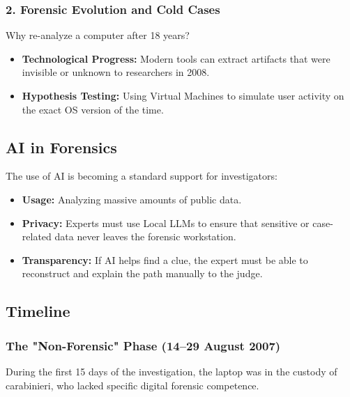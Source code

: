 \subsubsection*{2. Forensic Evolution and Cold Cases}
Why re-analyze a computer after 18 years?
\begin{itemize}
    \item \textbf{Technological Progress:} Modern tools can extract artifacts that were invisible or unknown to researchers in 2008.
    \item \textbf{Hypothesis Testing:} Using Virtual Machines to simulate user activity on the exact OS version of the time.
\end{itemize}

\subsection{AI in Forensics}
The use of AI is becoming a standard support for investigators:
\begin{itemize}
    \item \textbf{Usage:} Analyzing massive amounts of public data.
    \item \textbf{Privacy:} Experts must use Local LLMs to ensure that sensitive or case-related data never leaves the forensic workstation.
    \item \textbf{Transparency:} If AI helps find a clue, the expert must be able to reconstruct and explain the path manually to the judge.
\end{itemize}


\subsection{Timeline}

\subsubsection{The "Non-Forensic" Phase (14--29 August 2007)}
During the first 15 days of the investigation, the laptop was in the custody of carabinieri, who lacked specific digital forensic competence.


